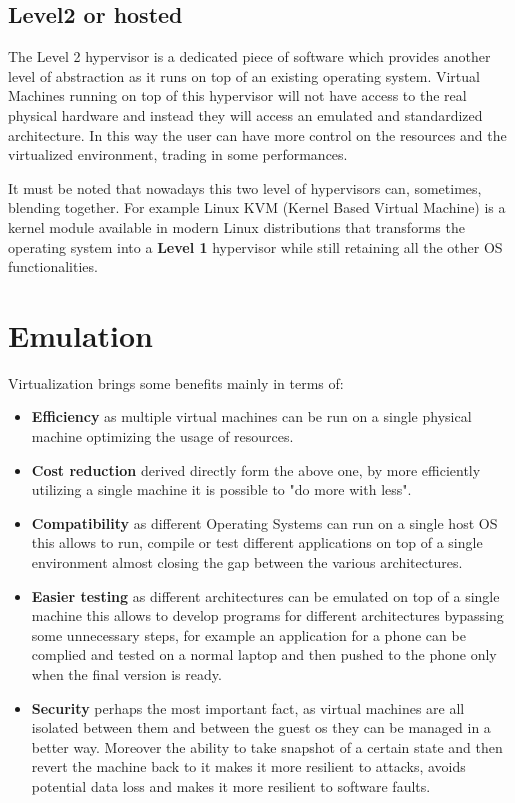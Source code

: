 \subsection{Level2 or hosted}

The Level 2 hypervisor is a dedicated piece of software which provides another level of abstraction as it runs on top of an existing operating system. Virtual Machines running on top of this hypervisor will not have access to the real physical hardware and instead they will access an emulated and standardized architecture. In this way the user can have more control on the resources and the virtualized environment, trading in some performances. 

It must be noted that nowadays this two level of hypervisors can, sometimes, blending together. For example Linux KVM (Kernel Based Virtual Machine) is a kernel module available in modern Linux distributions that transforms the operating system into a \textbf{Level 1} hypervisor while still retaining all the other OS functionalities.

\section{Emulation}
Virtualization brings some benefits mainly in terms of:
\begin{itemize}
    \item \textbf{Efficiency} as multiple virtual machines can be run on a single physical machine optimizing the usage of resources.
    \item \textbf{Cost reduction} derived directly form the above one, by more efficiently utilizing a single machine it is possible to "do more with less".
    \item \textbf{Compatibility} as different Operating Systems can run on a single host OS this allows to run, compile or test different applications on top of a single environment almost closing the gap between the various architectures.
    \item \textbf{Easier testing} as different architectures can be emulated on top of a single machine this allows to develop programs for different architectures bypassing some unnecessary steps, for example an application for a phone can be complied and tested on a normal laptop and then pushed to the phone only when the final version is ready.
    \item \textbf{Security} perhaps the most important fact, as virtual machines are all isolated between them and between the guest os they can be managed in a better way. Moreover the ability to take snapshot of a certain state and then revert the machine back to it makes it more resilient to attacks, avoids potential data loss and makes it more resilient to software faults. 
\end{itemize}


